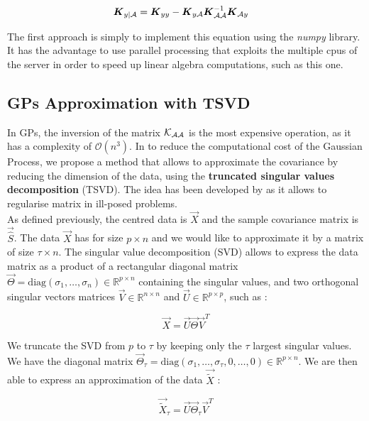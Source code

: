 \begin{align}
	{\boldsymbol{{K}}}_{y | \mathcal{A}} &=  {\boldsymbol{{K}}}_{yy} - {\boldsymbol{{K}}}_{y\mathcal{A}} {\boldsymbol{{K}}}_{\mathcal{A}\mathcal{A}}^{-1} {\boldsymbol{{K}}}_{\mathcal{A} y} 
\end{align}

The first approach is simply to implement this equation using the \textit{numpy} library. It has the advantage to use parallel processing that exploits the multiple cpus of the server in order to speed up linear algebra computations, such as this one. 

\subsection{GPs Approximation with TSVD}

In GPs, the inversion of the matrix $\mathcal{K}_{\mathcal{A}\mathcal{A}}$ is the most expensive operation, as it has a complexity of $\mathcal{O}(n^3)$. In to reduce the computational cost of the Gaussian Process, we propose a method that allows to approximate the covariance by reducing the dimension of the data, using the \textbf{truncated singular values decomposition} (TSVD). The idea has been developed by \citep{hansen_truncatedsvd_1987} as it allows to regularise matrix in ill-posed problems.  \\

As defined previously, the centred data is $\vec{X}$ and the sample covariance matrix is $\vec{\hat{S}}$. The data $\vec{X}$ has for size $p\times n$ and we would like to approximate it by a matrix of size $\tau \times n $. The singular value decomposition (SVD) allows to express the data matrix as a product of a rectangular diagonal matrix $\vec{\Theta} = \text{diag}(\sigma_1, \dots, \sigma_n ) \in \mathbb{R}^{p \times n} $ containing the singular values, and two orthogonal singular vectors matrices $\vec{V} \in \mathbb{R}^{n \times n} $ and $\vec{U} \in \mathbb{R}^{p \times p} $, such as : 

\begin{equation}
	\vec{X} = \vec{U} \vec{\Theta} \vec{V}^T
\end{equation}

We truncate the SVD from $p$ to $\tau$ by keeping only the $\tau$ largest singular values. We have the diagonal matrix $\vec{\Theta}_\tau = \text{diag}(\sigma_1, \dots, \sigma_\tau, 0, \dots, 0 ) \in \mathbb{R}^{p \times n} $. We are then able to express an approximation of the data $\vec{\tilde{X}}$ : 

\begin{equation}
	\vec{\tilde{X}}_\tau = \vec{U} \vec{\Theta}_\tau \vec{V}^T
\end{equation}


